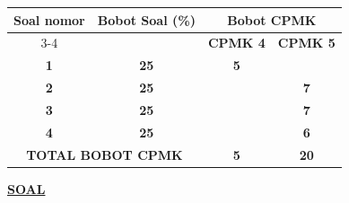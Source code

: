\documentclass[11pt,letterpaper]{article}
\begin{document}
\begin{center}
  \begin{tabular}{|c|c|c|c|}
    \hline
    \multirow{2}{*}{\textbf{Soal nomor}}            & \multirow{2}{*}{\textbf{Bobot Soal (\%)}} & \multicolumn{2}{c|}{\textbf{Bobot CPMK}}                   \\ \cline{3-4}
                                                    &                                           & \textbf{CPMK 4}                          & \textbf{CPMK 5} \\ \hline
    \textbf{1}                                      & \textbf{25}                               & \textbf{5}                               &                 \\ \hline
    \textbf{2}                                      & \textbf{25}                               &                                          & \textbf{7}      \\ \hline
    \textbf{3}                                      & \textbf{25}                               &                                          & \textbf{7}      \\ \hline
    \textbf{4}                                      & \textbf{25}                               &                                          & \textbf{6}      \\ \hline
    \multicolumn{2}{|c|}{\textbf{TOTAL BOBOT CPMK}} & \textbf{5}                                & \textbf{20}                                                \\ \hline
  \end{tabular}
\end{center}

\begin{center}
  \underline{\textbf{SOAL}}
\end{center}
\end{document}
